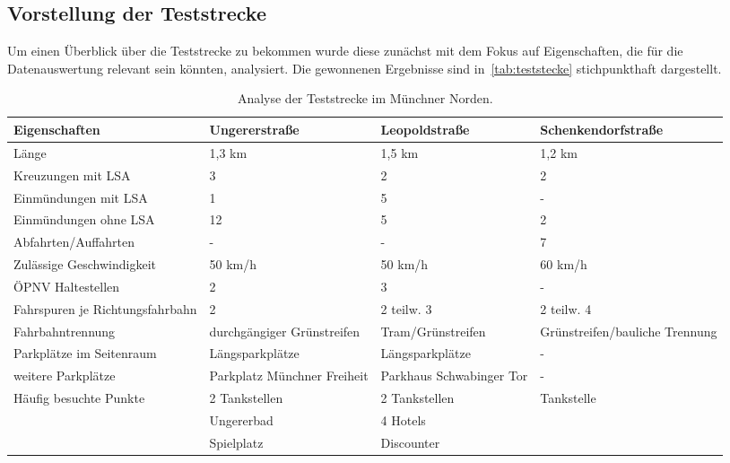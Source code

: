 \subsection{Vorstellung der Teststrecke}\label{subsechtion:Vorstellung der Teststrecke}
Um einen Überblick über die Teststrecke zu bekommen wurde diese zunächst mit dem Fokus auf Eigenschaften, die für die Datenauswertung relevant sein könnten, analysiert. Die gewonnenen Ergebnisse sind in~\autoref{tab:teststecke} stichpunkthaft dargestellt. 

\begin{table}[htpb]
	\scriptsize
	\caption[Analyse der Teststrecke im Münchner Norden.]{Analyse der Teststrecke im Münchner Norden.}\label{tab:teststecke}
	\centering
	\begin{tabular}{l p{3cm} p{3cm} p{3cm}}
		\toprule
		Eigenschaften & Ungererstraße & Leopoldstraße & Schenkendorfstraße \\
		\midrule
		Länge & 1,3 km & 1,5 km & 1,2 km \\
		Kreuzungen mit LSA & 3 & 2 & 2 \\
		Einmündungen mit LSA & 1 & 5 & - \\
		Einmündungen ohne LSA & 12 & 5 & 2 \\
		Abfahrten/Auffahrten & - & - & 7 \\
		Zulässige Geschwindigkeit & 50 km/h & 50 km/h & 60 km/h \\%
		ÖPNV Haltestellen & 2 & 3 & - \\
		Fahrspuren je Richtungsfahrbahn & 2 & 2 teilw. 3 & 2 teilw. 4 \\
		Fahrbahntrennung & durchgängiger Grünstreifen & Tram/Grünstreifen & Grünstreifen/bauliche Trennung\\
		Parkplätze im Seitenraum & Längsparkplätze & Längsparkplätze & - \\
		weitere Parkplätze & Parkplatz Münchner Freiheit & Parkhaus Schwabinger Tor & - \\
		Häufig besuchte Punkte & 2 Tankstellen & 2 Tankstellen & Tankstelle\\
		& Ungererbad & 4 Hotels & \\
		& Spielplatz & Discounter & \\
		\bottomrule
	\end{tabular}
\end{table}

